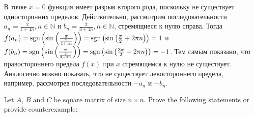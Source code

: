 \documentclass[addpoints, answers]{exam} %
\DeclareMathOperator{\sgn}{\rm sgn}
\begin{document}
\begin{questions}
\begin{solution}
В точке $x=0$ функция имеет разрыв второго рода, поскольку не существует односторонних пределов. Действительно, рассмотрим последовательности $a_n = \frac{2}{1+4 n}, n
\in \mathbb{N}$ и $b_n = \frac{2}{3+4 n}, n \in \mathbb{N}$, стремящиеся к нулю справа. Тогда $f(a_n) = {\sgn} \left(\sin \left( \frac{\pi}{\frac{2}{1+4 n}}\right)\right) = {\sgn} \left( \sin \left( \frac{\pi}{2} + 2 \pi n \right)\right)=1$ и $f(b_n) = {\sgn} \left(\sin \left( \frac{\pi}{\frac{2}{3+4 n}}\right)\right) = {\sgn} \left( \sin \left( \frac{3 \pi}{2} + 2 \pi n \right)\right)=-1$. Тем самым показано, что правостороннего предела $f(x)$ при $x$ стремящемся к нулю не существует. Аналогично можно показать, что не существует левостороннего предела, например, рассмотрев последовательности $-a_n$ и $-b_n$.
\end{solution}





\question Let $A$, $B$ and $C$ be square matrix of size $n\times n$. Prove the following statements or provide counterexample:

\end{questions}
\end{document}
